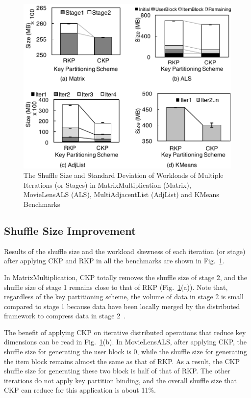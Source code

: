 \documentclass[10pt,journal,compsoc]{IEEEtran}
\begin{document}
\begin{figure}[!t]
\centering
\includegraphics[width=1\columnwidth]{figure5}
\caption{The Shuffle Size and Standard Deviation of Workloads of Multiple Iterations (or Stages) in MatrixMultiplication (Matrix), MovieLensALS (ALS), MultiAdjacentList (AdjList) and KMeans Benchmarks
}
\label{fig:size}
\end{figure}


\subsection{Shuffle Size Improvement} 
Results of the shuffle size and the workload skewness of each iteration (or stage) after applying CKP and RKP in all the benchmarks are shown in Fig.~\ref{fig:size}. 

In MatrixMultiplication, CKP totally removes the shuffle size of stage 2, and the shuffle size of stage 1 remains close to that of RKP (Fig.~\ref{fig:size}(a)). 
Note that, regardless of the key partitioning scheme, the volume of data in stage 2 is small compared to stage 1 because data have been locally merged by the distributed framework to compress data in stage 2~\cite{zaharia2012resilient}.

The benefit of applying CKP on iterative distributed operations 
that reduce key dimensions can be read in Fig.~\ref{fig:size}(b).
In MovieLensALS, after applying CKP, the shuffle size for generating the user block is 0, while the shuffle size for generating the item block remains almost the same as that of RKP. 
As a result, the CKP shuffle size for generating these two block is half of that of RKP. 
The other iterations do not apply key partition binding, and
the overall shuffle size that CKP can reduce for this application is about 11\%.
\end{document}
